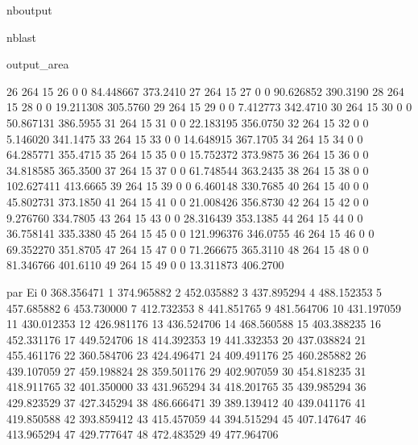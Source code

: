 \documentclass[letterpaper,10pt,english]{sphinxmanual}
\begin{document}
\begin{sphinxuseclass}{nboutput}
\begin{sphinxuseclass}{nblast}
{\begin{sphinxuseclass}{output_area}
\begin{sphinxuseclass}{}
\begin{sphinxVerbatim}[commandchars=\\\{\}]
26  264    15        26      0               0   84.448667  373.2410
27  264    15        27      0               0   90.626852  390.3190
28  264    15        28      0               0   19.211308  305.5760
29  264    15        29      0               0    7.412773  342.4710
30  264    15        30      0               0   50.867131  386.5955
31  264    15        31      0               0   22.183195  356.0750
32  264    15        32      0               0    5.146020  341.1475
33  264    15        33      0               0   14.648915  367.1705
34  264    15        34      0               0   64.285771  355.4715
35  264    15        35      0               0   15.752372  373.9875
36  264    15        36      0               0   34.818585  365.3500
37  264    15        37      0               0   61.748544  363.2435
38  264    15        38      0               0  102.627411  413.6665
39  264    15        39      0               0    6.460148  330.7685
40  264    15        40      0               0   45.802731  373.1850
41  264    15        41      0               0   21.008426  356.8730
42  264    15        42      0               0    9.276760  334.7805
43  264    15        43      0               0   28.316439  353.1385
44  264    15        44      0               0   36.758141  335.3380
45  264    15        45      0               0  121.996376  346.0755
46  264    15        46      0               0   69.352270  351.8705
47  264    15        47      0               0   71.266675  365.3110
48  264    15        48      0               0   81.346766  401.6110
49  264    15        49      0               0   13.311873  406.2700

        par Ei
0   368.356471
1   374.965882
2   452.035882
3   437.895294
4   488.152353
5   457.685882
6   453.730000
7   412.732353
8   441.851765
9   481.564706
10  431.197059
11  430.012353
12  426.981176
13  436.524706
14  468.560588
15  403.388235
16  452.331176
17  449.524706
18  414.392353
19  441.332353
20  437.038824
21  455.461176
22  360.584706
23  424.496471
24  409.491176
25  460.285882
26  439.107059
27  459.198824
28  359.501176
29  402.907059
30  454.818235
31  418.911765
32  401.350000
33  431.965294
34  418.201765
35  439.985294
36  429.823529
37  427.345294
38  486.666471
39  389.139412
40  439.041176
41  419.850588
42  393.859412
43  415.457059
44  394.515294
45  407.147647
46  413.965294
47  429.777647
48  472.483529
49  477.964706
\end{sphinxVerbatim}



\end{sphinxuseclass}
\end{sphinxuseclass}
}

\end{sphinxuseclass}
\end{sphinxuseclass}
\end{document}
